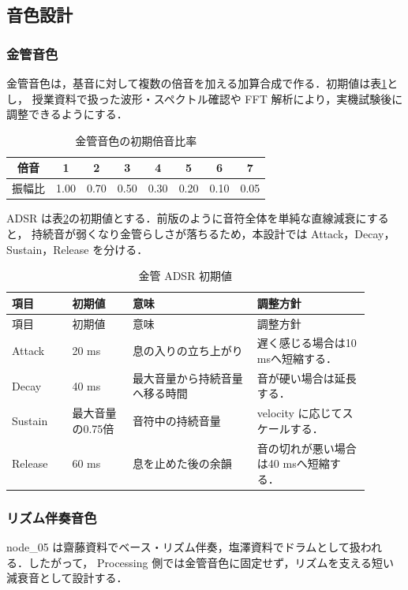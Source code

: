 \documentclass[lualatex,book,openany,paper=a4paper,jafontsize=11.5pt,jafontscale=1.05]{jlreq}
\begin{document}
\subsection{音色設計}
\subsubsection{金管音色}
金管音色は，基音に対して複数の倍音を加える加算合成で作る．初期値は表\ref{tab:harmonics}とし，
授業資料で扱った波形・スペクトル確認や FFT 解析により，実機試験後に調整できるようにする．

\begin{table}[htbp]
\centering
\caption{金管音色の初期倍音比率}\label{tab:harmonics}
\begin{tabular}{cccccccc}
\hline
倍音 & 1 & 2 & 3 & 4 & 5 & 6 & 7 \\
\hline
振幅比 & 1.00 & 0.70 & 0.50 & 0.30 & 0.20 & 0.10 & 0.05 \\
\hline
\end{tabular}
\end{table}

ADSR は表\ref{tab:adsr}の初期値とする．前版のように音符全体を単純な直線減衰にすると，
持続音が弱くなり金管らしさが落ちるため，本設計では Attack，Decay，Sustain，Release を分ける．

\begin{longtable}{p{0.15\linewidth}p{0.15\linewidth}p{0.31\linewidth}p{0.29\linewidth}}
\caption{金管 ADSR 初期値}\label{tab:adsr}\\
\hline
項目 & 初期値 & 意味 & 調整方針 \\
\hline
\endfirsthead
\hline
項目 & 初期値 & 意味 & 調整方針 \\
\hline
\endhead
Attack & 20 ms & 息の入りの立ち上がり & 遅く感じる場合は10 msへ短縮する． \\
\hline
Decay & 40 ms & 最大音量から持続音量へ移る時間 & 音が硬い場合は延長する． \\
\hline
Sustain & 最大音量の0.75倍 & 音符中の持続音量 & velocity に応じてスケールする． \\
\hline
Release & 60 ms & 息を止めた後の余韻 & 音の切れが悪い場合は40 msへ短縮する． \\
\hline
\end{longtable}

\subsubsection{リズム伴奏音色}
node\_05 は齋藤資料でベース・リズム伴奏，塩澤資料でドラムとして扱われる．したがって，
Processing 側では金管音色に固定せず，リズムを支える短い減衰音として設計する．
\end{document}
